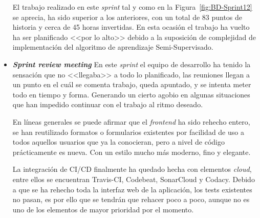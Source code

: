 \begin{itemize}
El trabajo realizado en este \textit{sprint} tal y como en la Figura~\ref{fig:BD-Sprint12} se aprecia, ha sido superior a los anteriores, con un total de 83 puntos de historia y cerca de 45 horas invertidas. En esta ocasión el trabajo ha vuelto ha ser planificado <<por lo alto>> debido a la suposición de complejidad de implementación del algoritmo de aprendizaje Semi-Supervisado. 

\item \textbf{\textit{Sprint review meeting}}
En este \textit{sprint} el equipo de desarrollo ha tenido la sensación que no <<llegaba>> a todo lo planificado, las reuniones llegan a un punto en el cuál se comenta trabajo, queda apuntado, y se intenta meter todo en tiempo y forma. Generando un cierto agobio en algunas situaciones que han impedido continuar con el trabajo al ritmo deseado.

En líneas generales se puede afirmar que el \textit{frontend} ha sido rehecho entero, se han reutilizado formatos o formularios existentes por facilidad de uso a todos aquellos usuarios que ya la conocieran, pero a nivel de código prácticamente es nueva. Con un estilo mucho más moderno, fino y elegante.

La integración de CI/CD finalmente ha quedado hecha con elementos \textit{cloud}, entre ellos se encuentran Travis-CI, Codebeat, SonarCloud y Codacy. Debido a que se ha rehecho toda la interfaz web de la aplicación, los tests existentes no pasan, es por ello que se tendrán que rehacer poco a poco, aunque no es uno de los elementos de mayor prioridad por el momento.

\end{itemize}

